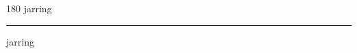 
\begin{frame}
\begin{center}
\begin{turn}{180}
{\fontsize{2.5cm}{1em}\selectfont jarring}
\end{turn}
\vspace{1em}\par  
\hrule
\vspace{1em}\par  
{\fontsize{2.5cm}{1em}\selectfont jarring}
\end{center}
\end{frame}

